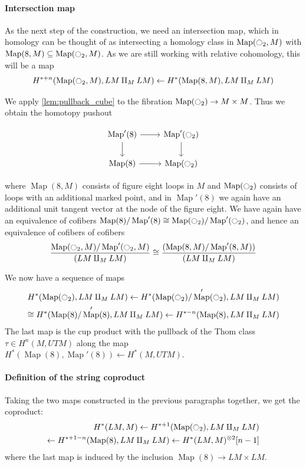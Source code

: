 \documentclass{scrartcl}
\theoremstyle{plain}
\theoremstyle{definition}
\renewcommand{\subset}{\subseteq}
\newcommand{\iso}{\cong}
\newcommand{\from}{\leftarrow}
\DeclareMathOperator{\Map}{Map}
\renewcommand{\coprod}{\mathbin{\amalg}}
\begin{document}
\paragraph{Intersection map} 
As the next step of the construction, we need an intersection map, which in homology can be thought of as intersecting a homology class in $\Map(\ocircle_2, M)$ with $\Map(8, M) \subset \Map(\ocircle_2, M)$. As we are still working with relative cohomology, this will be a map
\begin{align*}
    H^{*+n}(\Map(\ocircle_2, M), LM\coprod_M LM) \from H^*(\Map(8, M), LM \coprod_M LM)
\end{align*}

We apply \ref{lem:pullback_cube} to the fibration $\Map(\ocircle_2)\to M\times M$. Thus we obtain the homotopy pushout

\begin{equation}
    \begin{tikzcd}
        \Map'(8) \rar\dar &\Map'(\ocircle_2)\dar \\
        \Map(8) \rar & \Map(\ocircle_2)
    \end{tikzcd}
\end{equation}

where $\Map(8, M)$ consists of figure eight loops in $M$ and $\Map(\ocircle_2)$ consists of loops with an additional marked point, and in $\Map'(8)$ we again have an additional unit tangent vector at the node of the figure eight. We have again have an equivalence of cofibers $\Map(8) / \Map'(8) \iso \Map(\ocircle_2)/\Map'(\ocircle_2)$, and hence an equivalence of cofibers of cofibers
\begin{align*}
    \frac{\Map(\ocircle_2,M) / \Map'(\ocircle_2, M)} {(LM \coprod_M LM) } \iso \frac{(\Map(8,M) / \Map'(8, M)) }{(LM \coprod_M LM)}
\end{align*}

We now have a sequence of maps 
\begin{align*}
    H^*(\Map(\ocircle_2), LM\coprod_M LM) \from H^*(\Map(\ocircle_2)/ \Map'(\ocircle_2), LM\coprod_M LM) \\ \iso H^*(\Map(8) / \Map'(8), LM \coprod_M LM) \from H^{*-n}(\Map(8), LM \coprod_M LM)
\end{align*}
The last map is the cup product with the pullback of the Thom class $\tau\in H^n(M, UTM)$ along the map $H^*(\Map(8), \Map'(8)) \from H^*(M, UTM)$.

\paragraph{Definition of the string coproduct} Taking the two maps constructed in the previous paragraphs together, we get the coproduct:
\begin{align*}
    H^*(LM, M) \from H^{*+1}(\Map(\ocircle_2), LM \coprod_M LM) \\
    \from H^{*+1-n}(\Map(8), LM\coprod_M LM) \from H^*(LM, M)^{\otimes 2}[n-1]
\end{align*}
where the last map is induced by the inclusion $\Map(8)\to LM\times LM$.
\end{document}
